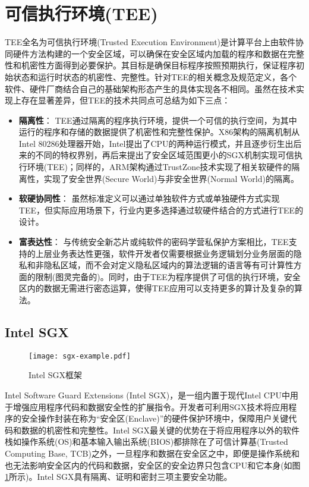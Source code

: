 \section{可信执行环境(TEE)}
\label{sec:background-tee}

TEE全名为可信执行环境(Trusted Execution Environment)是计算平台上由软件协同硬件方法构建的一个安全区域，可以确保在安全区域内加载的程序和数据在完整性和机密性方面得到必要保护。其目标是确保目标程序按照预期执行，保证程序初始状态和运行时状态的机密性、完整性。针对TEE的相关概念及规范定义，各个软件、硬件厂商结合自己的基础架构形态产生的具体实现各不相同。虽然在技术实现上存在显著差异，但TEE的技术共同点可总结为如下三点：

\begin{itemize}[leftmargin=*]
    \item \textbf{隔离性}：
    TEE通过隔离的程序执行环境，提供一个可信的执行空间，为其中运行的程序和存储的数据提供了机密性和完整性保护。X86架构的隔离机制从Intel 80286处理器开始，Intel提出了CPU的两种运行模式，并且逐步衍生出后来的不同的特权界别，再后来提出了安全区域范围更小的SGX机制实现可信执行环境(TEE)；同样的，ARM架构通过TrustZone技术实现了相关软硬件的隔离性，实现了安全世界(Secure World)与非安全世界(Normal World)的隔离。
    \item \textbf{软硬协同性}：
    虽然标准定义可以通过单独软件方式或单独硬件方式实现TEE，但实际应用场景下，行业内更多选择通过软硬件结合的方式进行TEE的设计。
    \item \textbf{富表达性}：
    与传统安全新芯片或纯软件的密码学营私保护方案相比，TEE支持的上层业务表达性更强，软件开发者仅需要根据业务逻辑划分业务层面的隐私和非隐私区域，而不会对定义隐私区域内的算法逻辑的语言等有可计算性方面的限制(图灵完备的)。同时，由于TEE为程序提供了可信的执行环境，安全区内的数据无需进行密态运算，使得TEE应用可以支持更多的算计及复杂的算法。
\end{itemize}

\subsection{Intel SGX}
\label{subsec:background-tee-sgx}

\begin{figure}[!htb]
    \small
    \centering
    \texttt{[image: sgx-example.pdf]}
    \caption{Intel SGX框架} 
    \label{fig:sgx-arch}
\end{figure}

Intel Software Guard Extensions (Intel SGX)\cite{sgx,sgx2}，是一组内置于现代Intel CPU中用于增强应用程序代码和数据安全性的扩展指令。开发者可利用SGX技术将应用程序的安全操作封装在称为“安全区(Enclave)”的硬件保护环境中，保障用户关键代码和数据的机密性和完整性。Intel SGX最关键的优势在于将应用程序以外的软件栈如操作系统(OS)和基本输入输出系统(BIOS)都排除在了可信计算基(Trusted Computing Base, TCB)之外，一旦程序和数据在安全区之中，即便是操作系统和也无法影响安全区内的代码和数据，安全区的安全边界只包含CPU和它本身(如图\ref{fig:sgx-arch}所示)。Intel SGX具有隔离、证明和密封三项主要安全功能。

